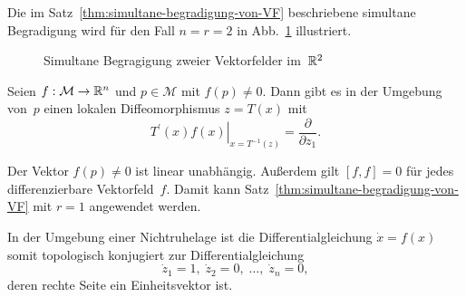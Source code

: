 Die im Satz~\ref{thm:simultane-begradigung-von-VF} beschriebene
simultane Begradigung wird für den Fall $n=r=2$ in Abb.~\ref{fig:Simultane-Begradigung-zweier-VF}
illustriert.

\begin{figure}
\begin{centering}

\par\end{centering}
\caption{Simultane Begragigung zweier Vektorfelder im~${\mathbb{R}}^{2}$\label{fig:Simultane-Begradigung-zweier-VF}}
\end{figure}

\begin{corollary}
\label{cor:begradigung-einer-Nichtruhelage}Seien
$f:\mathcal{M}\to{\mathbb{R}}^{n}$ und $p\in\mathcal{M}$ mit $f(p)\neq0$.
Dann gibt es in der Umgebung von~$p$ einen lokalen Diffeomorphismus
$z=T(x)$ mit 
\[
\left.T^{\prime}(x)f(x)\right|_{x=T^{-1}(z)}=\frac{\partial}{\partial z_{1}}.
\]
\end{corollary}
\begin{svmultproof2}
Der Vektor $f(p)\neq0$ ist linear unabhängig. Außerdem gilt $[f,f]=0$
für jedes differenzierbare Vektorfeld~$f$. Damit kann Satz~\ref{thm:simultane-begradigung-von-VF}
mit $r=1$ angewendet werden.
\end{svmultproof2}

In der Umgebung einer Nichtruhelage ist die Differentialgleichung
$\dot{x}=f(x)$ somit topologisch konjugiert zur Differentialgleichung
\[
\dot{z}_{1}=1,\;\dot{z}_{2}=0,\;\ldots,\;\dot{z}_{n}=0,
\]
deren rechte Seite ein Einheitsvektor ist.

